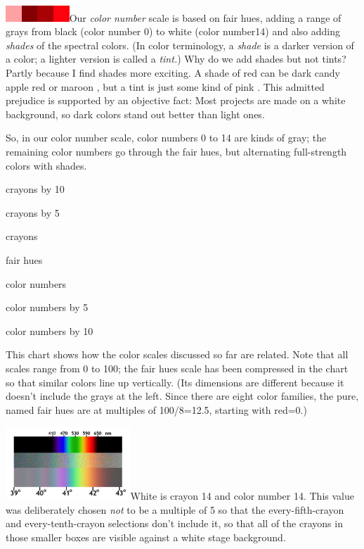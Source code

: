 \includegraphics[width=0.23611in,height=0.23611in]{media/image1192.png}\includegraphics[width=0.23611in,height=0.23611in]{media/image1193.png}\includegraphics[width=0.23611in,height=0.23611in]{media/image1194.png}\includegraphics[width=0.23611in,height=0.23611in]{media/image1195.png}Our
\emph{color number} scale is based on fair hues, adding a range of grays
from black (color number 0) to white (color number14) and also adding
\emph{shades} of the spectral colors. (In color terminology, a
\emph{shade} is a darker version of a color; a lighter version is called
a \emph{tint.}) Why do we add shades but not tints? Partly because I
find shades more exciting. A shade of red can be dark candy apple red or
maroon , but a tint is just some kind of pink . This admitted prejudice
is supported by an objective fact: Most projects are made on a white
background, so dark colors stand out better than light ones.

So, in our color number scale, color numbers 0 to 14 are kinds of gray;
the remaining color numbers go through the fair hues, but alternating
full-strength colors with shades.

crayons by 10

crayons by 5

crayons

fair hues

color numbers

color numbers by 5

color numbers by 10

This chart shows how the color scales discussed so far are related. Note
that all scales range from 0 to 100; the fair hues scale has been
compressed in the chart so that similar colors line up vertically. (Its
dimensions are different because it doesn't include the grays at the
left. Since there are eight color families, the pure, named fair hues
are at multiples of 100/8=12.5, starting with red=0.)

\includegraphics[width=1.85in,height=1.07986in]{media/image1198.png}White
is crayon 14 and color number 14. This value was deliberately chosen
\emph{not} to be a multiple of 5 so that the every-fifth-crayon and
every-tenth-crayon selections don't include it, so that all of the
crayons in those smaller boxes are visible against a white stage
background.


